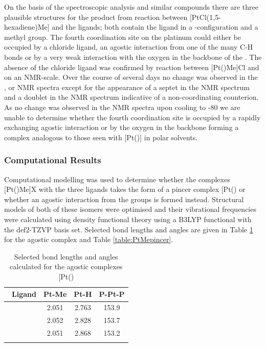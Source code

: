 On the basis of the spectroscopic analysis and similar compounds there are three plausible structures for the product from reaction between [PtCl(1,5-hexadiene)Me] and the \tBuxantphos{} ligands; both contain the \tBuxantphos{} ligand in a \trans{}-configuration and a methyl group.  The fourth coordination site on the platinum could either be occupied by a chloride ligand, an agostic interaction from one of the many \tBu{} C-H bonds or by a very weak interaction with the oxygen in the backbone of the \tBuxantphos{}.  The absence of the chloride ligand was confirmed by reaction between [Pt(\tBuxantphos)Me]Cl and  on an NMR-scale.  Over the course of several days no change was observed in the \proton{}, \carbon{} or \phosphorus{} NMR spectra except for the appearance of a septet in the \phosphorus{} NMR spectrum and a doublet in the \fluorine{} NMR spectrum indicative of a non-coordinating  counterion.  As no change was observed in the NMR spectra upon cooling to -80\degC{} we are unable to determine whether the fourth coordination site is occupied by a rapidly exchanging agostic interaction or by the oxygen in the backbone forming a complex analogous to those seen with [Pt(\tBuxantphos)] in polar solvents.

\subsubsection{Computational Results}

Computational modelling was used to determine whether the complexes [Pt(\tBuxantphos)Me]X with the three \tBuxantphos{} ligands takes the form of a pincer complex [Pt(\tBuxantphosk)\ce{Me]+} or whether an agostic interaction from the \tBu{} groups is formed instead.  Structural models of both of these isomers were optimised and their vibrational frequencies were calculated using density functional theory using a B3LYP functional\cite{Becke1993, Lee1988, Vosko1980, Stephens1994} with the def2-TZVP basis set\cite{Andrae1990, Weigend2005}.  Selected bond lengths and angles are given in Table \ref{table:PtMeagostic} for the agostic complex and Table \ref{table:PtMepincer}.

\begin{table}[htp]
\caption[Selected bond lengths and angles calculated for [Pt(\tBuxantphos)\ce{Me{]}+}]{Selected bond lengths and angles calculated for the agostic complexes [Pt(\tBuxantphos)\ce{Me]+}}
\vspace{1em}
\label{table:PtMeagostic}
\small
\begin{center}
\begin{tabular}{l c c c}
	\toprule
	~\bfseries{Ligand} & Pt-Me & Pt-H & P-Pt-P \\
	\midrule		
	~\tBuSixantphos	& 2.051	& 2.763 	& 153.9	\\
	~\tBuThixantphos	& 2.052	& 2.828 	& 153.7 	\\
	~\tBuXantphos{}	& 2.051	& 2.868	& 153.2	\\ 
	\bottomrule{}
\end{tabular}
\end{center}
\end{table}

